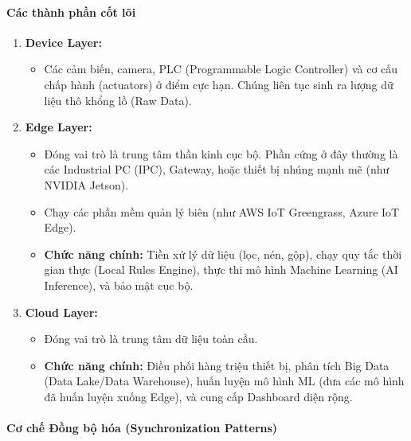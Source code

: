\paragraph*{Các thành phần cốt lõi}
\begin{enumerate}
    \item \textbf{Device Layer:}
    \begin{itemize}
        \item Các cảm biến, camera, PLC (Programmable Logic Controller) và cơ cấu chấp hành (actuators) ở điểm cực hạn. Chúng liên tục sinh ra lượng dữ liệu thô khổng lồ (Raw Data).
    \end{itemize}

    \item \textbf{Edge Layer:}
    \begin{itemize}
        \item Đóng vai trò là trung tâm thần kinh cục bộ. Phần cứng ở đây thường là các Industrial PC (IPC), Gateway, hoặc thiết bị nhúng mạnh mẽ (như NVIDIA Jetson).
        \item Chạy các phần mềm quản lý biên (như AWS IoT Greengrass, Azure IoT Edge).
        \item \textbf{Chức năng chính:} Tiền xử lý dữ liệu (lọc, nén, gộp), chạy quy tắc thời gian thực (Local Rules Engine), thực thi mô hình Machine Learning (AI Inference), và bảo mật cục bộ.
    \end{itemize}

    \item \textbf{Cloud Layer:}
    \begin{itemize}
        \item Đóng vai trò là trung tâm dữ liệu toàn cầu.
        \item \textbf{Chức năng chính:} Điều phối hàng triệu thiết bị, phân tích Big Data (Data Lake/Data Warehouse), huấn luyện mô hình ML (đưa các mô hình đã huấn luyện xuống Edge), và cung cấp Dashboard diện rộng.
    \end{itemize}
\end{enumerate}

\paragraph*{Cơ chế Đồng bộ hóa (Synchronization Patterns)}

